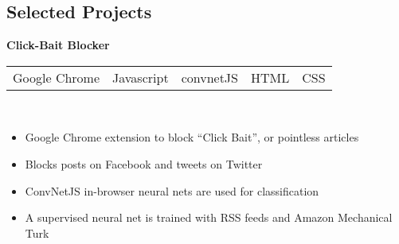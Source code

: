 \documentclass[margin,line,12pt]{res}
\begin{document}
{\begin{resume}
\vspace*{.20in}
{\color{Black}
  \vspace{-.13in}
  \section{\sc Selected Projects}}
\color{black}


{\bf Click-Bait Blocker} \
\\
\begin{tabular}{l l l l l}
  Google Chrome & Javascript & convnetJS & HTML & CSS 
\end{tabular}
\\
\vspace{-.16in}
\begin{itemize}
  \item Google Chrome extension to block ``Click Bait'', or pointless articles
  \item Blocks posts on Facebook and tweets on Twitter
  \item ConvNetJS in-browser neural nets are used for classification
  \item A supervised neural net is trained with RSS feeds and Amazon Mechanical Turk
\end{itemize}
\vspace{-.10in}


\end{resume}}
\end{document}
